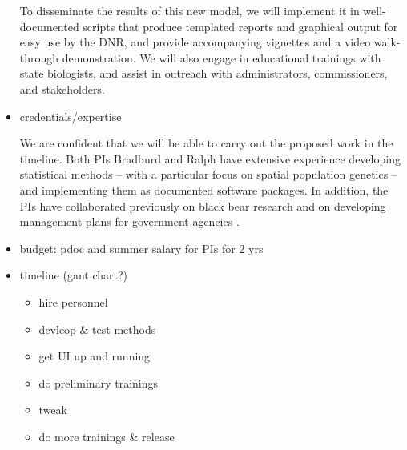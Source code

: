 \documentclass[12pt]{article}
\begin{document}
\begin{itemize}
To disseminate the results of this new model, 
we will implement it in well-documented scripts 
that produce templated reports and graphical output
for easy use by the DNR, 
and provide accompanying vignettes 
and a video walk-through demonstration. 
We will also engage in educational trainings with state biologists, 
and assist in outreach with 
administrators, commissioners, and stakeholders.

\item credentials/expertise 

We are confident that we will be able to 
carry out the proposed work in the timeline.
Both PIs Bradburd and Ralph have extensive 
experience developing statistical methods -- 
with a particular focus on spatial population genetics -- 
and implementing them as documented software packages.
In addition, the PIs have collaborated previously 
on black bear research \citep{SpaceMix}
and on developing management plans 
for government agencies \citep{DRECP}. 

\item budget: pdoc and summer salary for PIs for 2 yrs
\item timeline (gant chart?)
\begin{itemize}
\item hire personnel
\item devleop \& test methods
\item get UI up and running
\item do preliminary trainings
\item tweak
\item do more trainings \& release
\end{itemize}
\end{itemize}

\clearpage
%
\end{document}
